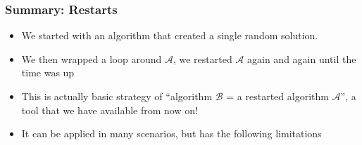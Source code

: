 \documentclass[mathserif]{beamer}%
\begin{document}
\begin{frame}%
\frametitle{Summary: Restarts}%
\begin{itemize}%
\item We started with an algorithm that created a single random solution.%
\item<3-> We then wrapped a loop around ${\mathcal A}$, we restarted ${\mathcal A}$ again and again until the time was up%
\item<5-> This is actually basic strategy of ``algorithm ${\mathcal B}$ = a restarted algorithm ${\mathcal A}$'', a tool that we have available from now on!%
\item<6-> It can be applied in many scenarios, but has the following limitations%
\end{itemize}%
\end{frame}%
%
\endPresentation%
\end{document}
